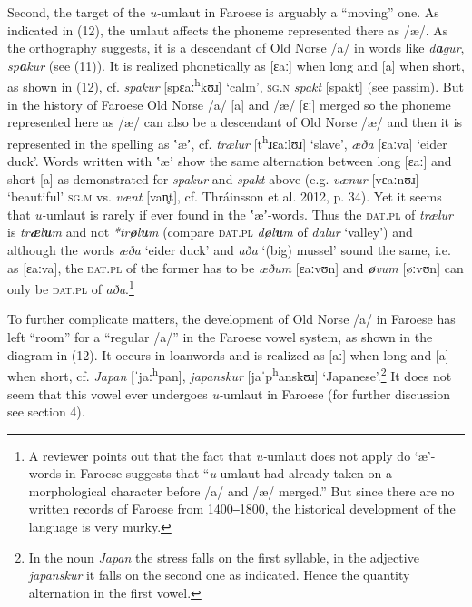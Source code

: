 \documentclass[output=paper,
modfonts
]{LSP/langsci}
\begin{document}
\begin{exe}
Second, the target of the \emph{u-}umlaut in Faroese is arguably a
``moving'' one. As indicated in (12), the umlaut affects the phoneme
represented there as /æ/. As the orthography suggests, it is a
descendant of Old Norse /a/ in words like \emph{d\textbf{a}gur},
\emph{sp\textbf{a}kur} (see (11)). It is realized phonetically as
{[}ɛaː{]} when long and {[}a{]} when short, as shown in (12), cf.
\emph{spakur} {[}spɛaː\textsuperscript{h}kʊɹ{]} `calm', \textsc{sg.n}
\emph{spakt} {[}spakt{]} (see \citealt[34]{thrainsson2012} passim). But
in the history of Faroese Old Norse /a/ {[}a{]} and /æ/ {[}ɛː{]} merged
so the phoneme represented here as /æ/ can also be a descendant of Old
Norse /æ/ and then it is represented in the spelling as ʽæʼ, cf.
\emph{trælur} {[}t\textsuperscript{h}ɹɛaːlʊɹ{]} `slave', \emph{æða}
{[}ɛaːva{]} `eider duck'. Words written with ʽæʼ show the same
alternation between long {[}ɛaː{]} and short {[}a{]} as demonstrated for
\emph{spakur} and \emph{spakt} above (e.g. \emph{vænur} {[}vɛaːnʊɹ{]}
`beautiful' \textsc{sg.m} vs. \emph{vænt} {[}van̥t{]}, cf. Thráinsson et
al. 2012, p. 34). Yet it seems that \emph{u-}umlaut is rarely if ever
found in the ʽæʼ-words. Thus the \textsc{dat.pl} of \emph{trælur} is
\emph{tr\textbf{æ}l\textbf{u}m} and not \emph{*tr\textbf{ø}l\textbf{u}m}
(compare \textsc{dat.pl} \emph{d\textbf{ø}l\textbf{u}m} of \emph{dalur}
`valley') and although the words \emph{æða} `eider duck' and \emph{aða}
`(big) mussel' sound the same, i.e. as {[}ɛaːva{]}, the \textsc{dat.pl}
of the former has to be \emph{æðum} {[}ɛaːvʊn{]} and
\emph{\textbf{ø}vum} {[}øːvʊn{]} can only be \textsc{dat.pl} of
\emph{aða}.\footnote{A reviewer points out that the fact that
  \emph{u-}umlaut does not apply do `æ'-words in Faroese suggests that
  ``\emph{u}-umlaut had already taken on a morphological character
  before /a/ and /æ/ merged.'' But since there are no written records of
  Faroese from 1400‒1800, the historical development of the language is
  very murky.}

To further complicate matters, the development of Old Norse /a/ in
Faroese has left ``room'' for a ``regular /a/'' in the Faroese vowel
system, as shown in the diagram in (12). It occurs in loanwords and is
realized as {[}aː{]} when long and {[}a{]} when short, cf. \emph{Japan}
{[}ˈjaː\textsuperscript{h}pan{]}, \emph{japanskur}
{[}jaˈp\textsuperscript{h}anskʊɹ{]} `Japanese'.\footnote{In the noun
  \emph{Japan} the stress falls on the first syllable, in the adjective
  \emph{japanskur} it falls on the second one as indicated. Hence the
  quantity alternation in the first vowel.} It does not seem that this
vowel ever undergoes \emph{u-}umlaut in Faroese (for further discussion
see section 4).


\end{exe}
\end{document}
